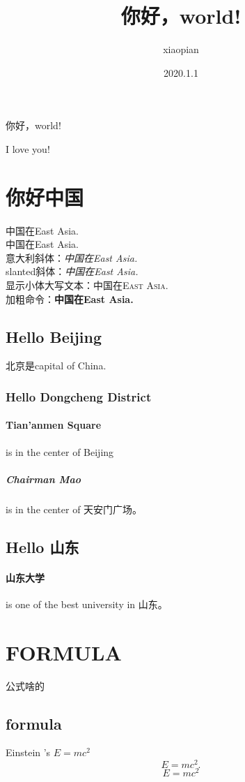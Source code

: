 \documentclass{article}
\title{你好，world!}
\author{xiaopian}
\date{2020.1.1}
\begin{document}


\thispagestyle{empty}   %
\tableofcontents
\maketitle
你好，world! 

I love you!        %
\section{你好中国}   %
中国在East Asia.\\
\textup{中国在East Asia.}\\
意大利斜体：\textit{中国在East Asia.}\\
slanted斜体：\textsl{中国在East Asia.}\\
显示小体大写文本：\textsc{中国在East Asia.}\\
加粗命令：\textbf{中国在East Asia.}
\subsection{Hello Beijing}   %
北京是capital of China.
\subsubsection{Hello Dongcheng District}  %
\paragraph{Tian'anmen Square}
is in the center of Beijing
\subparagraph{Chairman Mao}    %
is in the center of 天安门广场。
\subsection{Hello 山东}
\paragraph{山东大学} is one of the best university in 山东。

\section{FORMULA}
公式啥的
\subsection{formula}
Einstein 's $E=mc^2$   %
\[ E=mc^2. \]     %
\begin{equation*}  %
    E=mc^2
\end{equation*}
\end{document}
